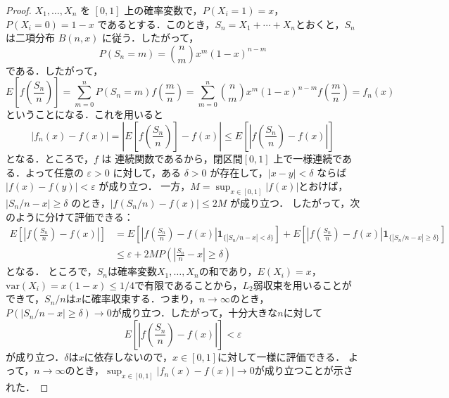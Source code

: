 \documentclass[dvipdfmx]{jsarticle}
\numberwithin{equation}{section}
\theoremstyle{definition}
\newcommand{\0}{\bm{0}}
\newcommand{\1}{\bm{1}}
\begin{document}
\begin{proof}

  $X_1,\dots,X_n$ を $[0,1]$ 上の確率変数で，$P(X_i=1)=x$，$P(X_i=0)=1-x$ であるとする．このとき，$S_n = X_1 + \cdots + X_n$とおくと，$S_n$ は二項分布 $B(n,x)$ に従う．したがって，
  \[
    P(S_n = m) = \binom{n}{m} x^m (1-x)^{n-m}
  \]
  である．したがって，
  \[
    E\!\left[f\!\left(\frac{S_n}{n}\right)\right] = \sum_{m=0}^n P(S_n = m) f\!\left(\frac{m}{n}\right) = \sum_{m=0}^n \binom{n}{m} x^m (1-x)^{n-m} f\!\left(\frac{m}{n}\right) = f_n(x)
  \]
  ということになる．これを用いると
  \[
    |f_n(x) - f(x)|=\left|E\!\left[f\!\left(\frac{S_n}{n}\right)\right] - f(x)\right|\leq E\!\left[\left|f\!\left(\frac{S_n}{n}\right) - f(x)\right|\right]
  \]
  となる．ところで，$f$ は 連続関数であるから，閉区間$[0,1]$ 上で一様連続である．よって任意の $\varepsilon>0$ に対して，ある $\delta>0$ が存在して，$|x-y|<\delta$ ならば $|f(x)-f(y)|<\varepsilon$ が成り立つ．
  一方，$M=\sup_{x\in[0,1]}|f(x)|$とおけば，$|S_n/n - x|\geq \delta$ のとき，$|f(S_n/n)-f(x)|\leq 2M$ が成り立つ．
  したがって，次のように分けて評価できる：
  \begin{align*}
    E\left[ \left| f\left(\frac{S_n}{n}\right) - f(x) \right| \right] 
    &= E\left[ \left| f\left(\frac{S_n}{n}\right) - f(x) \right| \boldsymbol{1}_{\{|S_n/n - x| < \delta\}} \right] + E\left[ \left| f\left(\frac{S_n}{n}\right) - f(x) \right| \boldsymbol{1}_{\{|S_n/n - x| \geq \delta\}} \right] \\
    &\leq \varepsilon+ 2M P\left( \left| \frac{S_n}{n} - x \right| \geq \delta \right)
  \end{align*}
  となる．
  ところで，$S_n$は確率変数$X_1,\dots,X_n$の和であり，$E(X_i)=x$，$\mathrm{var}(X_i)=x(1-x)\leq 1/4$で有限であることから，$L_2$弱収束を用いることができて，$S_n/n$は$x$に確率収束する．つまり，$n\to\infty$のとき，$P(|S_n/n - x| \geq \delta) \to 0$が成り立つ．したがって，十分大きな$n$に対して
\[
  E\left[ \left| f\left(\frac{S_n}{n}\right) - f(x) \right| \right] < \varepsilon
\]
が成り立つ．$\delta$は$x$に依存しないので，$x\in[0,1]$に対して一様に評価できる．
よって，$n\to\infty$のとき，$\sup_{x\in[0,1]} |f_n(x) - f(x)| \to 0$が成り立つことが示された．

\end{proof}
\end{document}
